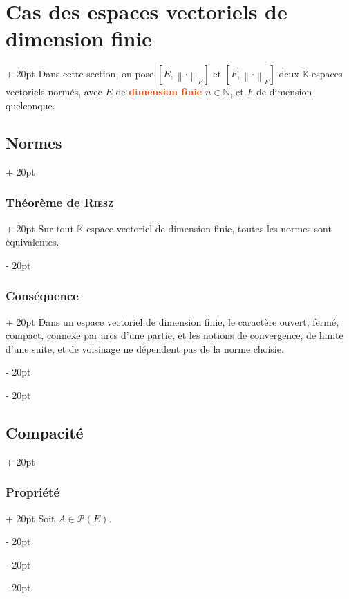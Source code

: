 \documentclass[a4paper, 12pt, twoside]{article}
\newcommand{\Emph}{\textcolor{ff4500}}
\newcommand{\N}{\mathbb{N}} %
\newcommand{\K}{\mathbb K}
\newcommand{\norm}[1]{\left\lVert #1 \right\rVert}
\newcommand{\ind}[1][20pt]{\advance\leftskip + #1}
\newcommand{\deind}[1][20pt]{\advance\leftskip - #1}
\newenvironment{indt}[2][20pt]{#2 \par \ind[#1]}{\par \deind} %
\begin{document}
    \vspace{12pt}
    
    \begin{indt}{\section{Cas des espaces vectoriels de dimension finie}}
        Dans cette section, on pose $[E, \norm \cdot _E]$ et $[F, \norm \cdot _F]$ deux $\K$-espaces vectoriels normés, avec $E$ de \Emph{\bf dimension finie} $n \in \N$, et $F$ de dimension quelconque.

        \begin{indt}{\subsection{Normes}}
            \begin{indt}{\subsubsection{Théorème de \textsc{Riesz}}}
                Sur tout $\K$-espace vectoriel de dimension finie, toutes les normes sont équivalentes.
            \end{indt}

            \vspace{12pt}
            
            \begin{indt}{\subsubsection{Conséquence}}
                Dans un espace vectoriel de dimension finie, le caractère ouvert, fermé, compact, connexe par arcs d'une partie, et les notions de convergence, de limite d'une suite, et de voisinage ne dépendent pas de la norme choisie.
            \end{indt}
        \end{indt}

        \vspace{12pt}
        
        \begin{indt}{\subsection{Compacité}}
            \begin{indt}{\subsubsection{Propriété}}
                Soit $A \in \mathcal P(E)$.


\end{indt}
\end{indt}
\end{indt}
\end{document}
